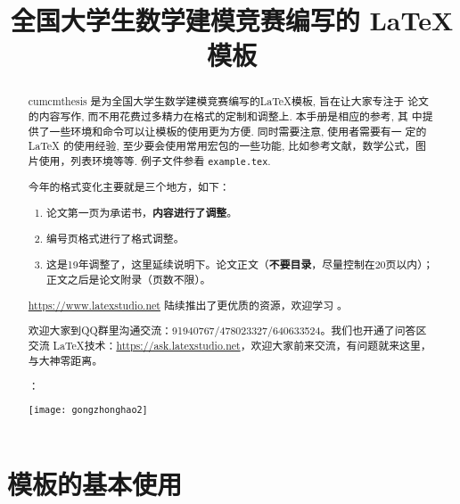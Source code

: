 \documentclass{cumcmthesis}
\title{全国大学生数学建模竞赛编写的 \LaTeX{} 模板}
\begin{document}
 \maketitle
 \begin{abstract}
cumcmthesis 是为全国大学生数学建模竞赛编写的\LaTeX{}模板, 旨在让大家专注于 论文的内容写作, 而不用花费过多精力在格式的定制和调整上. 本手册是相应的参考, 其 中提供了一些环境和命令可以让模板的使用更为方便. 同时需要注意, 使用者需要有一 定的 \LaTeX{} 的使用经验, 至少要会使用常用宏包的一些功能, 比如参考文献，数学公式，图片使用，列表环境等等. 例子文件参看 \texttt{example.tex}.

\begin{mdframed} [%
	roundcorner=5pt,
	linecolor=gray!50,
	outerlinewidth=0.5pt,
	middlelinewidth=0.3pt, backgroundcolor=gray!2,
innertopmargin=\topskip, frametitle={2020 年建模比赛格式变化说明},
frametitlefont= \bfseries,frametitlerule=true,frametitlealignment =\raggedright\noindent,
frametitlerulewidth=.5pt, frametitlebackgroundcolor=gray!2,]
今年的格式变化主要就是三个地方，如下：
\begin{enumerate}
\item 论文第一页为承诺书，\textbf{\color{red}内容进行了调整}。

\item 编号页格式进行了格式调整。

\item 这是19年调整了，这里延续说明下。论文正文（\textbf{\color{red}不要目录}，尽量控制在20页以内）；正文之后是论文附录（页数不限）。

\end{enumerate}

\end{mdframed}


\url{https://www.latexstudio.net} 陆续推出了更优质的资源，欢迎学习 。

欢迎大家到QQ群里沟通交流：91940767/478023327/640633524。我们也开通了问答区交流 \LaTeX{}技术：\url{https://ask.latexstudio.net}，欢迎大家前来交流，有问题就来这里，与大神零距离。

：

\centerline{\texttt{[image: gongzhonghao2]}}

\end{abstract}



\section{模板的基本使用}
\end{document}
